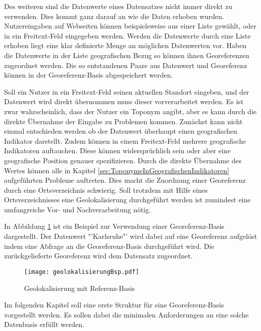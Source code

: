 		Des weiteren sind die Datenwerte eines Datensatzes nicht immer direkt zu verwenden.
		Dies kommt ganz darauf an wie die Daten erhoben wurden. 
		Nutzereingaben auf Webseiten können beispielsweise aus einer Liste gewählt, oder in ein Freitext-Feld eingegeben werden.
		Werden die Datenwerte durch eine Liste erhoben liegt eine klar definierte Menge an möglichen Datenwerten vor.
		Haben die Datenwerte in der Liste geografischen Bezug so können ihnen Georeferenzen zugeordnet werden.
		Die so entstandenen Paare aus Datenwert und Georeferenz können in der Georeferenz-Basis abgespeichert werden.

		Soll ein Nutzer in ein Freitext-Feld seinen aktuellen Standort eingeben, und der Datenwert wird direkt übernommen muss dieser vorverarbeitet werden.
		Es ist zwar wahrscheinlich, dass der Nutzer ein Toponym angibt, aber es kann durch die direkte Übernahme der Eingabe zu Problemen kommen.
		Zunächst kann nicht einmal entschieden werden ob der Datenwert überhaupt einen geografischen Indikator darstellt.
		Zudem können in einem Freitext-Feld mehrere geografische Indikatoren auftauchen.
		Diese können widersprüchlich sein oder aber eine geografische Position genauer spezifizieren. 
		Durch die direkte Übernahme des Wertes können alle in Kapitel \ref{sec:ToponymeInGeografischenIndikatoren} aufgeführten Probleme auftreten.
		Dies macht die Zuordnung einer Georeferenz durch eine Ortsverzeichnis schwierig.
		Soll trotzdem mit Hilfe eines Ortsverzeichnisses eine Geolokalisierung durchgeführt werden ist zumindest eine umfangreiche Vor- und Nachverarbeitung nötig.

		In Abbildung \ref{img:geolokalisierungBsp} ist ein Beispiel zur Verwendung einer Georeferenz-Basis dargestellt.
		Der Datenwert "'Karlsruhe"' wird dabei auf eine Georeferenz aufgelöst indem eine Abfrage an die Georeferenz-Basis durchgeführt wird.
		Die zurückgelieferte Georeferenz wird dem Datensatz zugeordnet.

		\begin{figure}[!ht]
		\begin{center}
		\texttt{[image: geolokalisierungBsp.pdf]}
		\caption{Geolokalisierung mit Referenz-Basis}
		\label{img:geolokalisierungBsp}
		\end{center}
		\end{figure}	

		Im folgenden Kapitel soll eine erste Struktur für eine Georeferenz-Basis vorgestellt werden.
		Es sollen dabei die minimalen Anforderungen an eine solche Datenbasis erfüllt werden.

